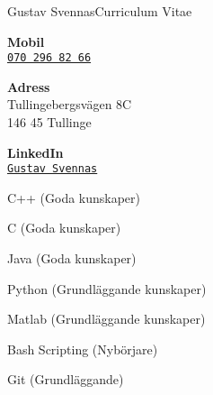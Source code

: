 \documentclass{article}
\begin{document}
\begin{cv}{Gustav Svennas}{Curriculum Vitae}
\cvseparator[3]
\begin{cvitem}[Phone][4]
    \textbf{Mobil}\\
    \href{tel:+46702968266}{\texttt{070 296 82 66}}
\end{cvitem}

\cvseparator[3]
\begin{cvitem}[Home][4]
    \textbf{Adress}\\
    Tullingebergsvägen 8C\\ 146 45 Tullinge
\end{cvitem}

\cvseparator[3]
\begin{cvitem}[Globe][4]
    \textbf{LinkedIn}\\
    \href{https://www.linkedin.com/in/gustav-svennas-18b575159}{\texttt{Gustav Svennas}}
\end{cvitem}



\begin{cvitem}
    C++ (Goda kunskaper)
\end{cvitem}

\begin{cvitem}
    C (Goda kunskaper)
\end{cvitem}

\begin{cvitem}
    Java (Goda kunskaper)
\end{cvitem}

\begin{cvitem}
    Python (Grundläggande kunskaper)
\end{cvitem}

\cvseparator
\begin{cvitem}
    Matlab (Grundläggande kunskaper)
\end{cvitem}

\cvseparator
\begin{cvitem}
    Bash Scripting (Nybörjare)
\end{cvitem}


\cvseparator
\begin{cvitem}
    Git (Grundläggande)
\end{cvitem}




\end{cv}
\end{document}
